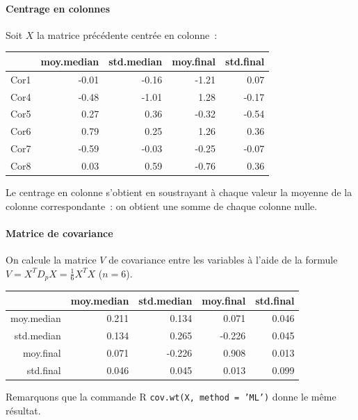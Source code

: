\documentclass[a4paper,11pt]{report}
\begin{document}
\paragraph{Centrage en colonnes}
Soit $X$ la matrice précédente centrée en colonne~:
\begin{table}[H]
	\centering
	\begin{tabular}{r|rrrr}
		& moy.median & std.median & moy.final & std.final \\ 
		\hline
		Cor1 & -0.01 & -0.16 & -1.21 & 0.07 \\ 
		Cor4 & -0.48 & -1.01 & 1.28 & -0.17 \\ 
		Cor5 & 0.27 & 0.36 & -0.32 & -0.54 \\ 
		Cor6 & 0.79 & 0.25 & 1.26 & 0.36 \\ 
		Cor7 & -0.59 & -0.03 & -0.25 & -0.07 \\ 
		Cor8 & 0.03 & 0.59 & -0.76 & 0.36 \\ 
	\end{tabular}
\end{table}
Le centrage en colonne s'obtient en soustrayant à chaque valeur la moyenne de la colonne correspondante~: on obtient une somme de chaque colonne nulle.


\paragraph{Matrice de covariance}
On calcule la matrice $V$ de covariance entre les variables à l'aide de la formule $V = X^TD_{p}X = \frac{1}{6}X^TX$ ($n = 6$).

\begin{table}[H]
	\centering
	\begin{tabular}{r|rrrr}
		& moy.median & std.median & moy.final & std.final \\ 
		\hline
		moy.median & 0.211 & 0.134 & 0.071 & 0.046 \\ 
		std.median & 0.134 & 0.265 & -0.226 & 0.045 \\ 
		moy.final & 0.071 & -0.226 & 0.908 & 0.013 \\ 
		std.final & 0.046 & 0.045 & 0.013 & 0.099 \\ 
	\end{tabular}
\end{table}

Remarquons que la commande R \texttt{cov.wt(X, method = 'ML')} donne le même résultat.
\end{document}
